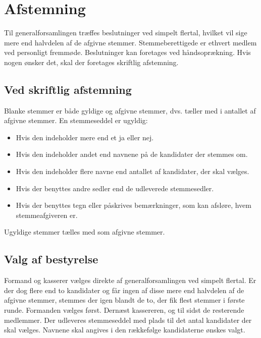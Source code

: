 \documentclass[a4paper, 10pt]{article}
\begin{document}
\section{Afstemning}

Til generalforsamlingen træffes beslutninger ved simpelt flertal,
hvilket vil sige mere end halv\-delen af de afgivne stemmer.
Stemmeberettigede er ethvert medlem ved personligt fremmøde.
Beslutninger kan foretages ved håndsoprækning. Hvis nogen ønsker det,
skal der foretages skriftlig afstemning.

\subsection*{Ved skriftlig afstemning}

Blanke stemmer er både gyldige og afgivne stemmer, dvs. tæller med i
antallet af afgivne stemmer. En stemmeseddel er ugyldig:

\begin{itemize}

\item Hvis den indeholder mere end et ja eller nej.

\item Hvis den indeholder andet end navnene på de kandidater der
stemmes om.

\item Hvis den indeholder flere navne end antallet af kandidater, der
skal vælges.

\item Hvis der benyttes andre sedler end de udleverede stemmesedler.

\item Hvis der benyttes tegn eller påskrives bemærkninger, som kan
afsløre, hvem stemmeafgiveren er.

\end{itemize}

Ugyldige stemmer tælles med som afgivne stemmer.

\subsection*{Valg af bestyrelse}

Formand og kasserer vælges direkte af generalforsamlingen ved simpelt
flertal. Er der dog flere end to kandidater og får ingen af disse mere
end halvdelen af de afgivne stemmer, stemmes der igen blandt de to,
der fik flest stemmer i første runde. Formanden vælges først. Dernæst
kassereren, og til sidst de resterende medlemmer. Der udleveres
stemmeseddel med plads til det antal kandidater der skal vælges.
Navnene skal angives i den rækkefølge kandidaterne ønskes valgt.
\end{document}
